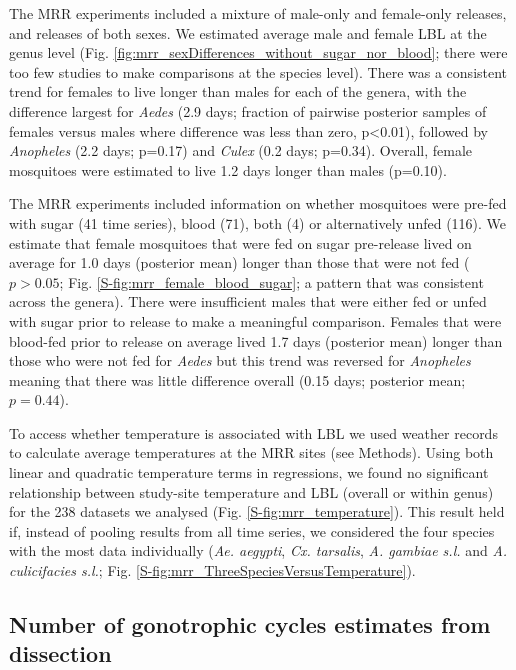 \documentclass[]{article}
\begin{document}
The MRR experiments included a mixture of male-only and female-only
releases, and releases of both sexes. We estimated average male and
female LBL at the genus level (Fig. \ref{fig:mrr_sexDifferences_without_sugar_nor_blood}; there were too few studies to
make comparisons at the species level). There was a consistent trend for
females to live longer than males for each of the genera, with the
difference largest for \emph{Aedes} (2.9 days; fraction of pairwise
posterior samples of females versus males where difference was less than
zero, p\textless{}0.01), followed by \emph{Anopheles} (2.2 days; p=0.17)
and \emph{Culex} (0.2 days; p=0.34). Overall, female mosquitoes were
estimated to live 1.2 days longer than males (p=0.10).

The MRR experiments included information on whether mosquitoes were
pre-fed with sugar (41 time series), blood (71), both (4) or
alternatively unfed (116). We estimate that female mosquitoes that were
fed on sugar pre-release lived on average for 1.0 days (posterior mean) longer than those
that were not fed ($p>0.05$; Fig. \ref{S-fig:mrr_female_blood_sugar}; a pattern that was consistent across the
genera). There were insufficient males that were either fed or unfed
with sugar prior to release to make a meaningful comparison. Females
that were blood-fed prior to release on average lived 1.7 days (posterior mean) longer
than those who were not fed for \emph{Aedes} but this trend was reversed
for \emph{Anopheles} meaning that there was little difference overall (0.15 days; posterior mean; $p=0.44$).

To access whether temperature is associated with LBL we used weather
records to calculate average temperatures at the MRR sites (see
Methods). Using both linear and quadratic temperature terms in
regressions, we found no significant relationship between study-site
temperature and LBL (overall or within genus) for the 238 datasets we
analysed (Fig. \ref{S-fig:mrr_temperature}). This result held if, instead of pooling results from
all time series, we considered the four species with the most data
individually (\emph{Ae. aegypti}, \emph{Cx. tarsalis}, \emph{A. gambiae s.l.} and
\emph{A. culicifacies s.l.}; Fig. \ref{S-fig:mrr_ThreeSpeciesVersusTemperature}).

\subsection{Number of gonotrophic cycles estimates from dissection}\label{number-of-gonotrophic-cycles-estimates-from-dissection}
\end{document}
